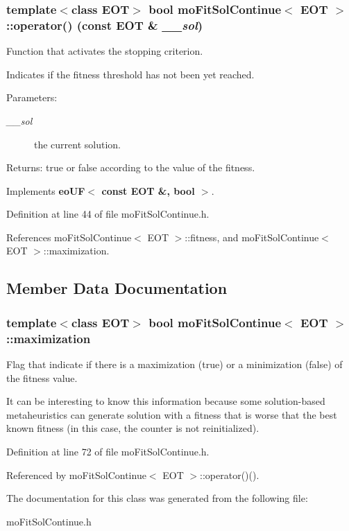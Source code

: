 \subsubsection{\setlength{\rightskip}{0pt plus 5cm}template$<$class EOT$>$ bool {\bf moFitSolContinue}$<$ EOT $>$::operator() (const EOT \& {\em \_\-\_\-sol})\hspace{0.3cm}{\tt  [inline, virtual]}}\label{classmo_fit_sol_continue_fa9f0a15f99c998115cae9b456403a27}


Function that activates the stopping criterion. 

Indicates if the fitness threshold has not been yet reached.

\begin{Desc}
\item[Parameters:]
\begin{description}
\item[{\em \_\-\_\-sol}]the current solution. \end{description}
\end{Desc}
\begin{Desc}
\item[Returns:]true or false according to the value of the fitness. \end{Desc}


Implements {\bf eoUF$<$ const EOT \&, bool $>$}.

Definition at line 44 of file moFitSolContinue.h.

References moFitSolContinue$<$ EOT $>$::fitness, and moFitSolContinue$<$ EOT $>$::maximization.

\subsection{Member Data Documentation}
\subsubsection{\setlength{\rightskip}{0pt plus 5cm}template$<$class EOT$>$ bool {\bf moFitSolContinue}$<$ EOT $>$::{\bf maximization}\hspace{0.3cm}{\tt  [private]}}\label{classmo_fit_sol_continue_d686a52cbcaa57924a585c7c90456612}


Flag that indicate if there is a maximization (true) or a minimization (false) of the fitness value. 

It can be interesting to know this information because some solution-based metaheuristics can generate solution with a fitness that is worse that the best known fitness (in this case, the counter is not reinitialized). 

Definition at line 72 of file moFitSolContinue.h.

Referenced by moFitSolContinue$<$ EOT $>$::operator()().

The documentation for this class was generated from the following file:\begin{CompactItemize}
\item 
moFitSolContinue.h\end{CompactItemize}
